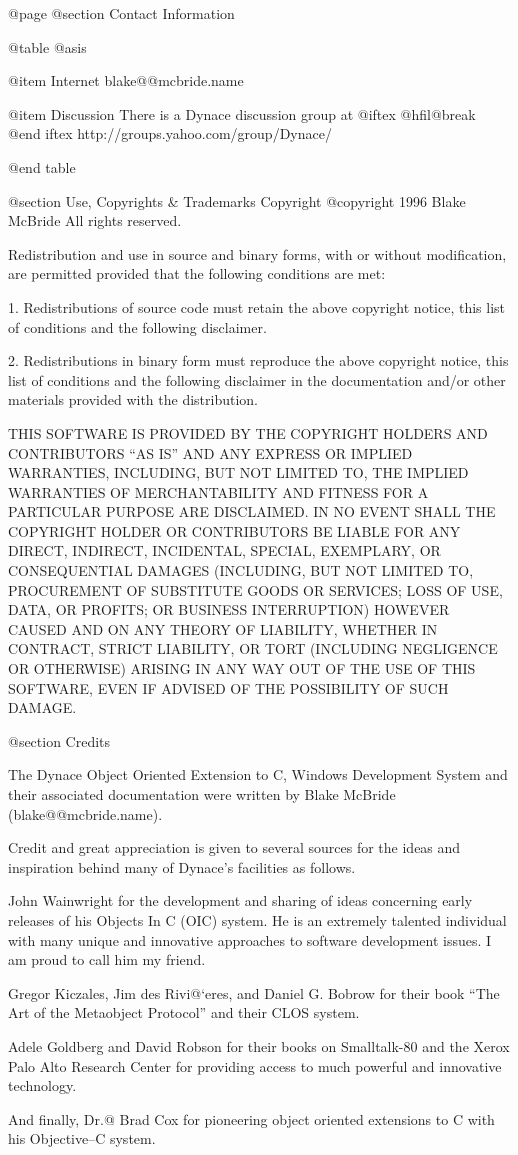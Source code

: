 @page
@section Contact Information

@table @asis

@item Internet
blake@@mcbride.name

@item Discussion
There is a Dynace discussion group at 
@iftex
@hfil@break
@end iftex
http://groups.yahoo.com/group/Dynace/

@end table




@section Use, Copyrights & Trademarks
Copyright  @copyright{} 1996 Blake McBride
All rights reserved.

Redistribution and use in source and binary forms, with or without
modification, are permitted provided that the following conditions are
met:

1. Redistributions of source code must retain the above copyright
notice, this list of conditions and the following disclaimer.

2. Redistributions in binary form must reproduce the above copyright
notice, this list of conditions and the following disclaimer in the
documentation and/or other materials provided with the distribution.

THIS SOFTWARE IS PROVIDED BY THE COPYRIGHT HOLDERS AND CONTRIBUTORS
``AS IS'' AND ANY EXPRESS OR IMPLIED WARRANTIES, INCLUDING, BUT NOT
LIMITED TO, THE IMPLIED WARRANTIES OF MERCHANTABILITY AND FITNESS FOR
A PARTICULAR PURPOSE ARE DISCLAIMED. IN NO EVENT SHALL THE COPYRIGHT
HOLDER OR CONTRIBUTORS BE LIABLE FOR ANY DIRECT, INDIRECT, INCIDENTAL,
SPECIAL, EXEMPLARY, OR CONSEQUENTIAL DAMAGES (INCLUDING, BUT NOT
LIMITED TO, PROCUREMENT OF SUBSTITUTE GOODS OR SERVICES; LOSS OF USE,
DATA, OR PROFITS; OR BUSINESS INTERRUPTION) HOWEVER CAUSED AND ON ANY
THEORY OF LIABILITY, WHETHER IN CONTRACT, STRICT LIABILITY, OR TORT
(INCLUDING NEGLIGENCE OR OTHERWISE) ARISING IN ANY WAY OUT OF THE USE
OF THIS SOFTWARE, EVEN IF ADVISED OF THE POSSIBILITY OF SUCH DAMAGE.

@section Credits


The Dynace Object Oriented Extension to C, Windows Development System
and their associated documentation were written by Blake McBride
(blake@@mcbride.name).

Credit and great appreciation is given to several sources for the
ideas and inspiration behind many of Dynace's facilities as follows.

John Wainwright for the development and sharing of ideas concerning
early releases of his Objects In C (OIC) system.  He is an extremely
talented individual with many unique and innovative approaches to
software development issues.  I am proud to call him my friend.

Gregor Kiczales, Jim des Rivi@`eres, and Daniel G. Bobrow for their
book ``The Art of the Metaobject Protocol'' and their CLOS
system.

Adele Goldberg and David Robson for their books on Smalltalk-80 and
the Xerox Palo Alto Research Center for providing access to much
powerful and innovative technology.

And finally, Dr.@ Brad Cox for pioneering object oriented extensions
to C with his Objective--C system.


